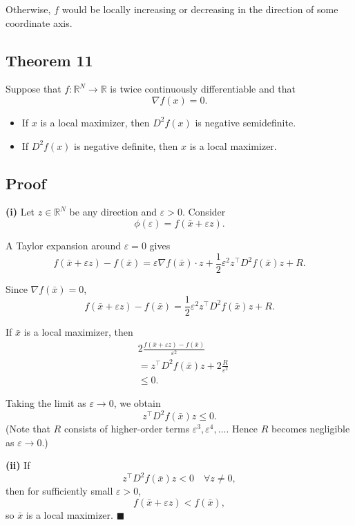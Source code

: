 Otherwise, $f$ would be locally increasing or decreasing
in the direction of some coordinate axis.
\begin{tcolorbox}[breakable, colback=white]

\subsection*{Theorem 11}

Suppose that $f : \mathbb{R}^N \to \mathbb{R}$ is twice continuously differentiable
and that
\[
\nabla f(x) = 0.
\]

\begin{itemize}
    \item[(i)] If $x$ is a local maximizer, then $D^2 f(x)$ is negative semidefinite.
    \item[(ii)] If $D^2 f(x)$ is negative definite, then $x$ is a local maximizer.
\end{itemize}

\subsection*{Proof}

\textbf{(i)} Let $z \in \mathbb{R}^N$ be any direction and $\varepsilon > 0$.
Consider
\[
\phi(\varepsilon) = f(\bar x + \varepsilon z).
\]

A Taylor expansion around $\varepsilon=0$ gives
\[
f(\bar x+\varepsilon z) - f(\bar x)
=
\varepsilon \nabla f(\bar x)\cdot z
+ \frac{1}{2}\varepsilon^2 z^\top D^2 f(\bar x) z + R.
\]

Since $\nabla f(\bar x)=0$,
\[
f(\bar x+\varepsilon z) - f(\bar x)
=
\frac{1}{2}\varepsilon^2 z^\top D^2 f(\bar x) z + R.
\]

If $\bar x$ is a local maximizer, then
\[
\begin{aligned}
&2 \frac{f(\bar x+\varepsilon z) - f(\bar x)}{\varepsilon ^2}\\
&= z^\top D^2 f(\bar x) z + 2 \frac{R}{\varepsilon ^2}\\
&\le 0.
\end{aligned}
\]

Taking the limit as $\varepsilon \to 0$, we obtain
\[
z^\top D^2 f(\bar x) z \le 0.
\]
(Note that $R$ consists of higher-order terms $\varepsilon^3, \varepsilon^4, \dots$.
Hence $R$ becomes negligible as $\varepsilon \to 0$.)
\medskip

\textbf{(ii)} If
\[
z^\top D^2 f(\bar x) z < 0 \quad \forall z \ne 0,
\]
then for sufficiently small $\varepsilon > 0$,
\[
f(\bar x+\varepsilon z) < f(\bar x),
\]
so $\bar x$ is a local maximizer. \quad $\blacksquare$


\end{tcolorbox}


